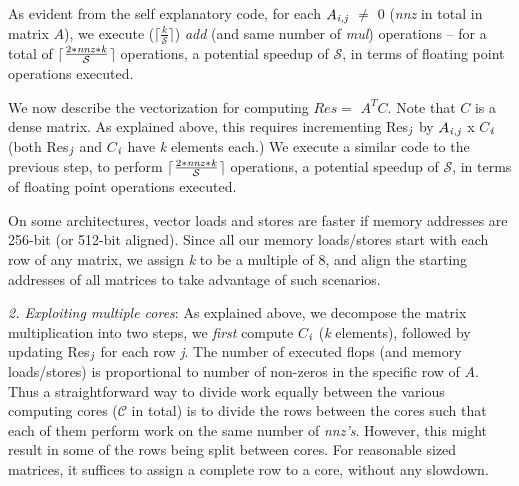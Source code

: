      As evident from the self explanatory code, for each
     $A_{{\it{i}},{\it{j}}}$ $\neq$ 0 ({\it{nnz}} in total in matrix $A$), 
     we execute ($\lceil$$\frac{k}{\mathcal{S}}$$\rceil$) 
     {\it{add}} (and same number of {\it{mul}}) operations -- for a
     total of
     $\lceil$$\frac{2*{\it{nnz}}*{\it{k}}}{\mathcal{S}}$$\rceil$ operations,
     a potential speedup of $\mathcal{S}$,  
     in terms of floating point operations executed.

     We now describe the vectorization for computing $Res =$ $A^TC$.
     Note that $C$ is a dense matrix. As explained above, this
     requires incrementing Res$_{{\it{j}}}$ 
     by $A_{{\it{i}},{\it{j}}}$ x $C$$_{{\it{i}}}$ 
     (both Res$_{{\it{j}}}$ and $C$$_{{\it{i}}}$ have {\it{k}} elements each.)
    We execute a similar code to the previous step, to perform 
    $\lceil$$\frac{2*{\it{nnz}}*{\it{k}}}{\mathcal{S}}$$\rceil$
    operations,
    a potential speedup of $\mathcal{S}$,
    in terms of floating point operations executed.

    On some architectures, vector loads and stores are faster if
    memory addresses are 256-bit (or 512-bit aligned). 
    Since all our memory loads/stores start with each row of any
    matrix, we assign {\it{k}}  to be a multiple of 8, and align the
    starting addresses of all matrices to take advantage of such
    scenarios.
    


     \vspace*{0.1in}
     {\it{2. Exploiting multiple cores}}: As explained above, we
     decompose the matrix multiplication into two steps, %
     we {\it{first}} compute
     $C$$_{{\it{i}}}$ ({\it{k}} elements), followed by updating 
     Res$_{{\it{j}}}$ for each row {\it{j}}. The number of executed 
     flops (and memory loads/stores) is proportional to number of
     non-zeros in the specific row of $A$. Thus a straightforward way
     to divide work equally between the various computing cores
     ($\mathcal{C}$ in total) is to divide the rows between the cores
     such that each of them perform work on the same number of {\it{nnz's}}. However,
     this might result in some of the rows being split between cores.
     For reasonable sized matrices, it suffices to assign a complete
     row to a core, without any slowdown.

